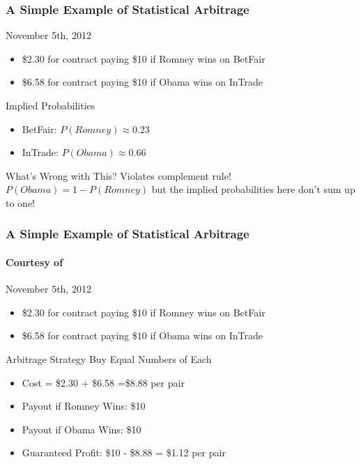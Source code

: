\documentclass{beamer}
\begin{document}
\begin{frame}
\frametitle{A Simple Example of Statistical Arbitrage}

\begin{block}{November 5th, 2012}
	\begin{itemize}
		\item\$2.30 for contract paying \$10 if Romney wins on BetFair
		\item \$6.58 for contract paying \$10 if Obama wins on InTrade
	\end{itemize}
\end{block}

\begin{block}{Implied Probabilities}
	\begin{itemize}
	\item BetFair: $P(Romney) \approx 0.23$
	\item InTrade: $P(Obama) \approx 0.66$
	\end{itemize}
\end{block}

\begin{alertblock}{What's Wrong with This?}\pause
 Violates complement rule! $P(Obama) = 1 - P(Romney)$ but the implied probabilities here don't sum up to one!
\end{alertblock}



\end{frame}

\begin{frame}
\frametitle{A Simple Example of Statistical Arbitrage}
\framesubtitle{Courtesy of  }

\begin{block}{November 5th, 2012}
	\begin{itemize}
		\item\$2.30 for contract paying \$10 if Romney wins on BetFair
		\item \$6.58 for contract paying \$10 if Obama wins on InTrade
	\end{itemize}
\end{block}

\begin{alertblock}{Arbitrage Strategy}
Buy Equal Numbers of Each 
	\begin{itemize}
		\item Cost = \$2.30 + \$6.58 =\$8.88 per pair 
		\item Payout if Romney Wins: \$10 
		\item Payout if Obama Wins: \$10
		\item Guaranteed Profit: \$10 - \$8.88 = \$1.12 per pair
	\end{itemize} 

\end{alertblock}

\end{frame}
\end{document}
